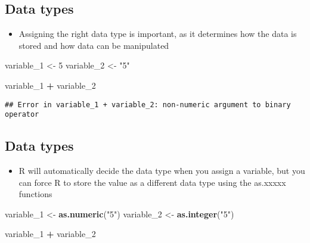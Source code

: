 \documentclass[]{article}
\newenvironment{Shaded}{\begin{snugshade}}{\end{snugshade}}
\newcommand{\KeywordTok}[1]{\textcolor[rgb]{0.13,0.29,0.53}{\textbf{#1}}}
\newcommand{\DecValTok}[1]{\textcolor[rgb]{0.00,0.00,0.81}{#1}}
\newcommand{\StringTok}[1]{\textcolor[rgb]{0.31,0.60,0.02}{#1}}
\newcommand{\OperatorTok}[1]{\textcolor[rgb]{0.81,0.36,0.00}{\textbf{#1}}}
\newcommand{\NormalTok}[1]{#1}
\providecommand{\tightlist}{%
  \setlength{\itemsep}{0pt}\setlength{\parskip}{0pt}}
\begin{document}
\subsection{Data types}\label{data-types-1}

\begin{itemize}
\tightlist
\item
  Assigning the right data type is important, as it determines how the
  data is stored and how data can be manipulated
\end{itemize}

\begin{Shaded}
\begin{Highlighting}[]
\NormalTok{variable_}\DecValTok{1}\NormalTok{ <-}\StringTok{ }\DecValTok{5}
\NormalTok{variable_}\DecValTok{2}\NormalTok{ <-}\StringTok{ "5"}

\NormalTok{variable_}\DecValTok{1} \OperatorTok{+}\StringTok{ }\NormalTok{variable_}\DecValTok{2}
\end{Highlighting}
\end{Shaded}

\begin{verbatim}
## Error in variable_1 + variable_2: non-numeric argument to binary operator
\end{verbatim}

\subsection{Data types}\label{data-types-2}

\begin{itemize}
\tightlist
\item
  R will automatically decide the data type when you assign a variable,
  but you can force R to store the value as a different data type using
  the as.xxxxx functions
\end{itemize}

\begin{Shaded}
\begin{Highlighting}[]
\NormalTok{variable_}\DecValTok{1}\NormalTok{ <-}\StringTok{ }\KeywordTok{as.numeric}\NormalTok{(}\StringTok{"5"}\NormalTok{)}
\NormalTok{variable_}\DecValTok{2}\NormalTok{ <-}\StringTok{ }\KeywordTok{as.integer}\NormalTok{(}\StringTok{"5"}\NormalTok{)}

\NormalTok{variable_}\DecValTok{1} \OperatorTok{+}\StringTok{ }\NormalTok{variable_}\DecValTok{2}
\end{Highlighting}
\end{Shaded}
\end{document}
